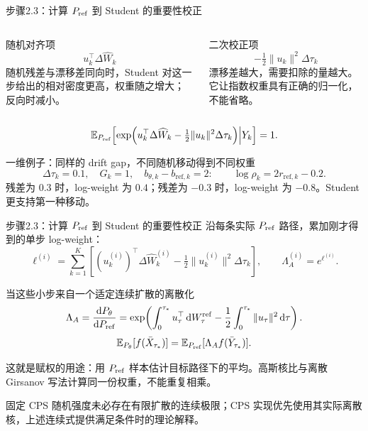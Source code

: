 \documentclass[10pt,aspectratio=169]{beamer}
\newcommand{\E}{\mathbb E}
\newcommand{\dd}{\,\mathrm d}
\newcommand{\sourceline}[1]{\par{\scriptsize\color{gray}#1}\par}
\begin{document}
\begin{frame}{步骤2.3：计算 \ensuremath{P_{\rm ref}} 到 Student 的重要性校正}
\small
\begin{columns}[T,onlytextwidth]
\begin{block}{随机对齐项}
\begin{equation}
u_k^\top\Delta\widehat W_k
\end{equation}
随机残差与漂移差同向时，Student 对这一步给出的相对密度更高，权重随之增大；反向时减小。
\end{block}
\begin{exampleblock}{二次校正项}
\begin{equation}
-\tfrac12\|u_k\|^2\Delta\tau_k
\end{equation}
漂移差越大，需要扣除的量越大。它让指数权重具有正确的归一化，不能省略。
\end{exampleblock}\end{columns}
\begin{equation}
\E_{P_{\rm ref}}\!\left[\exp\!\left(u_k^\top\Delta\widehat W_k-\tfrac12\|u_k\|^2\Delta\tau_k\right)\middle|Y_k\right]=1.
\end{equation}
\begin{block}{一维例子：同样的 drift gap，不同随机移动得到不同权重}
\begin{equation}
\Delta\tau_k=0.1,\quad G_k=1,\quad b_{\theta,k}-b_{\mathrm{ref},k}=2:
\qquad\log\rho_k=2r_{\mathrm{ref},k}-0.2.
\end{equation}
残差为 $0.3$ 时，log-weight 为 $0.4$；残差为 $-0.3$ 时，log-weight 为 $-0.8$。Student 更支持第一种移动。
\end{block}
\end{frame}

\begin{frame}{步骤2.3：计算 \ensuremath{P_{\rm ref}} 到 Student 的重要性校正}
\small
沿每条实际 \ensuremath{P_{\rm ref}} 路径，累加刚才得到的单步 log-weight：
\begin{equation}\label{eq:path-girsanov-discrete}
\ell^{(i)}=\sum_{k=1}^{K}\left[(u_k^{(i)})^\top\Delta\widehat W_k^{(i)}
-\tfrac12\|u_k^{(i)}\|^2\Delta\tau_k\right],\qquad \Lambda_A^{(i)}=e^{\ell^{(i)}}.
\end{equation}
\begin{block}{当这些小步来自一个适定连续扩散的离散化}
\begin{equation}\label{eq:girsanov}
\Lambda_A=\frac{\mathrm dP_\theta}{\mathrm dP_{\rm ref}}
=\exp\!\left(\int_0^{\tau_*}u_\tau^\top\dd W_\tau^\mathrm{ref}
-\frac12\int_0^{\tau_*}\|u_\tau\|^2\dd\tau\right).
\end{equation}
\begin{equation}\label{eq:change-of-measure}
\E_{P_\theta}[f(\bar X_{\tau_*})]=\E_{P_{\rm ref}}[\Lambda_A f(\bar Y_{\tau_*})].
\end{equation}
\end{block}
{\small 这就是赋权的用途：用 \ensuremath{P_{\rm ref}} 样本估计目标路径下的平均。高斯核比与离散 Girsanov 写法计算同一份权重，不能重复相乘。}
\sourceline{固定 CPS 随机强度未必存在有限扩散的连续极限；CPS 实现优先使用其实际离散核，上述连续式提供满足条件时的理论解释。}
\end{frame}
\end{document}
